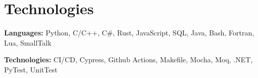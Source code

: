 	\vspace{0.6 cm}

	\section{Technologies}

	\begin{onecolentry}
		\textbf{Languages:} Python, C/C+\!+, C\#, Rust, JavaScript, SQL, Java, Bash,
		Fortran, Lua, SmallTalk
	\end{onecolentry}

	\begin{onecolentry}
		\textbf{Technologies:} CI/CD, Cypress, Github Actions, Makefile, Mocha, Moq, .NET, PyTest, UnitTest
	\end{onecolentry}

